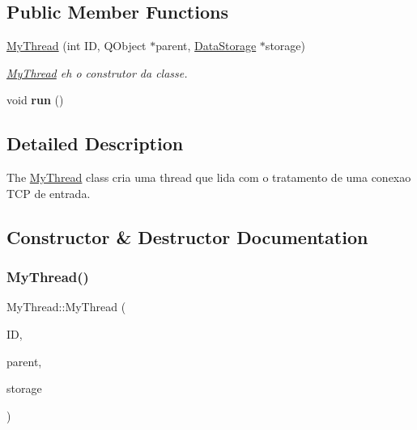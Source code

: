 \subsection*{Public Member Functions}
\begin{DoxyCompactItemize}
\item 
\mbox{\hyperlink{class_my_thread_ac1b04b0fa6b32038e810c7105ef762f6}{My\+Thread}} (int ID, Q\+Object $\ast$parent, \mbox{\hyperlink{class_data_storage}{Data\+Storage}} $\ast$storage)
\begin{DoxyCompactList}\small\item\em \mbox{\hyperlink{class_my_thread}{My\+Thread}} eh o construtor da classe. \end{DoxyCompactList}\item 
\mbox{\label{class_my_thread_a48f2e366e852087c53705f64e1ee65c2}} 
void {\bfseries run} ()
\end{DoxyCompactItemize}


\subsection{Detailed Description}
The \mbox{\hyperlink{class_my_thread}{My\+Thread}} class cria uma thread que lida com o tratamento de uma conexao T\+CP de entrada. 

\subsection{Constructor \& Destructor Documentation}
\mbox{\label{class_my_thread_ac1b04b0fa6b32038e810c7105ef762f6}} 
\subsubsection{\texorpdfstring{My\+Thread()}{MyThread()}}
{\footnotesize\ttfamily My\+Thread\+::\+My\+Thread (\begin{DoxyParamCaption}\item[{int}]{ID,  }\item[{Q\+Object $\ast$}]{parent,  }\item[{\mbox{\hyperlink{class_data_storage}{Data\+Storage}} $\ast$}]{storage }\end{DoxyParamCaption})}



